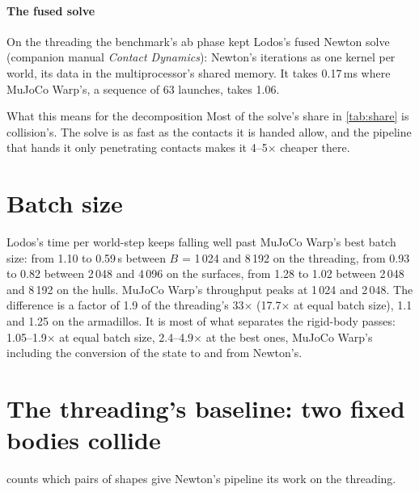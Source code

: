 \paragraph{The fused solve} On the threading the benchmark's ab phase kept Lodos's fused Newton solve (companion manual \emph{Contact Dynamics}): Newton's iterations as one kernel per world, its data in the multiprocessor's shared memory. It takes 0.17\,ms where MuJoCo Warp's, a sequence of 63 launches, takes 1.06.

\begin{notebox}{What this means for the decomposition}
Most of the solve's share in \cref{tab:share} is collision's. The solve is as fast as the contacts it is handed allow, and the pipeline that hands it only penetrating contacts makes it 4--5$\times$ cheaper there.
\end{notebox}

\section{Batch size}\label{sec:batch}

Lodos's time per world-step keeps falling well past MuJoCo Warp's best batch size: from 1.10 to 0.59\,\micro s between $B$ = 1\,024 and 8\,192 on the threading, from 0.93 to 0.82 between 2\,048 and 4\,096 on the surfaces, from 1.28 to 1.02 between 2\,048 and 8\,192 on the hulls. MuJoCo Warp's throughput peaks at 1\,024 and 2\,048. The difference is a factor of 1.9 of the threading's 33$\times$ (17.7$\times$ at equal batch size), 1.1 and 1.25 on the armadillos. It is most of what separates the rigid-body passes: 1.05--1.9$\times$ at equal batch size, 2.4--4.9$\times$ at the best ones, MuJoCo Warp's including the conversion of the state to and from Newton's.

\section{The threading's baseline: two fixed bodies collide}\label{sec:weld}

 counts which pairs of shapes give Newton's pipeline its work on the threading.

